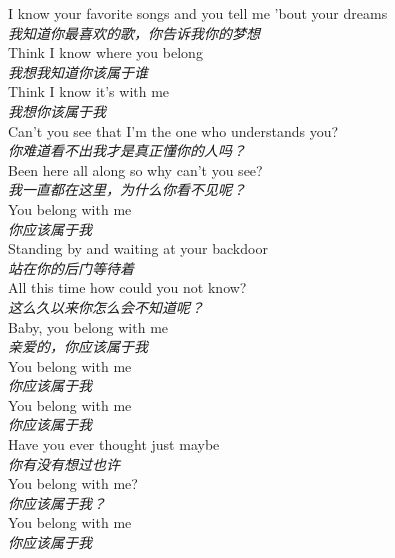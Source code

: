 \begin{spacing}{1.5}
\begin{flushleft}
I know your favorite songs and you tell me 'bout your dreams\\
\textit{我知道你最喜欢的歌，你告诉我你的梦想}\\[0.5em]

Think I know where you belong\\
\textit{我想我知道你该属于谁}\\[0.5em]

Think I know it's with me\\
\textit{我想你该属于我}\\[0.5em]

Can't you see that I'm the one who understands you?\\
\textit{你难道看不出我才是真正懂你的人吗？}\\[0.5em]

Been here all along so why can't you see?\\
\textit{我一直都在这里，为什么你看不见呢？}\\[0.5em]

You belong with me\\
\textit{你应该属于我}\\[0.5em]

Standing by and waiting at your backdoor\\
\textit{站在你的后门等待着}\\[0.5em]

All this time how could you not know?\\
\textit{这么久以来你怎么会不知道呢？}\\[0.5em]

Baby, you belong with me\\
\textit{亲爱的，你应该属于我}\\[0.5em]

You belong with me\\
\textit{你应该属于我}\\[0.5em]

You belong with me\\
\textit{你应该属于我}\\[0.5em]

Have you ever thought just maybe\\
\textit{你有没有想过也许}\\[0.5em]

You belong with me?\\
\textit{你应该属于我？}\\[0.5em]

You belong with me\\
\textit{你应该属于我}\\[0.5em]
\end{flushleft}
\end{spacing} 
